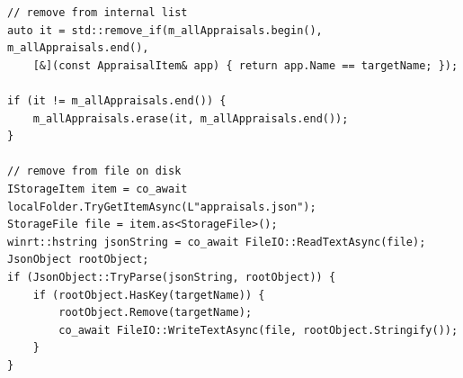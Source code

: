 \begin{verbatim}
// remove from internal list
auto it = std::remove_if(m_allAppraisals.begin(), m_allAppraisals.end(),
    [&](const AppraisalItem& app) { return app.Name == targetName; });

if (it != m_allAppraisals.end()) {
    m_allAppraisals.erase(it, m_allAppraisals.end());
}

// remove from file on disk
IStorageItem item = co_await localFolder.TryGetItemAsync(L"appraisals.json");
StorageFile file = item.as<StorageFile>();
winrt::hstring jsonString = co_await FileIO::ReadTextAsync(file);
JsonObject rootObject;
if (JsonObject::TryParse(jsonString, rootObject)) {
    if (rootObject.HasKey(targetName)) {
        rootObject.Remove(targetName);
        co_await FileIO::WriteTextAsync(file, rootObject.Stringify());
    }
}
\end{verbatim}
